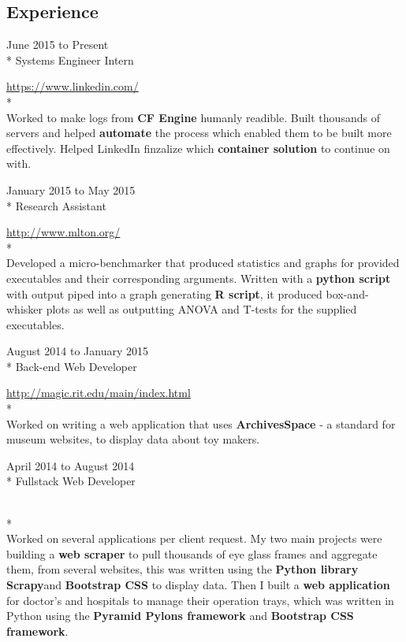 \documentclass[a4paper,margin,line]{resume}
\newcommand{\rurl}[1]{\hfill {\footnotesize \url{#1}}}
\newcommand{\rdate}[1]{\hfill {\small #1}}
\newcommand{\rproject}[4]{\item[#1] \hfill \rdate{#2} \\* \hfill \rdate{#3} \strut\hfill \rurl{#4} \\*}
\begin{document}
\begin{resume}
\section{\mysidestyle Experience}
	\begin{asparadesc}
        \rproject{LinkedIn}{June 2015 to Present}{Systems Engineer Intern}{https://www.linkedin.com/}
        \\
        \small
        Worked to make logs from {\bf CF Engine} humanly readible. Built thousands of servers and helped {\bf automate}
        the process which enabled them to be built more effectively. Helped LinkedIn finzalize which {\bf container 
        solution} to continue on with.
        \normalsize
        \\
        \rproject{Golisano College of Computing and Informational Sciences}{January 2015 to May 2015}{Research Assistant}{http://www.mlton.org/} 
        \\
        \small
        Developed a micro-benchmarker that produced statistics and graphs for provided executables
        and their corresponding arguments. Written with a {\bf python script} with output piped into
        a graph generating {\bf R script}, it produced box-and-whisker plots as well as outputting ANOVA and
        T-tests for the supplied executables.
        \normalsize
        \\
        \rproject{Media Arts Games Interaction and Creativity Center at RIT}{August 2014 to January 2015}{Back-end Web Developer}{http://magic.rit.edu/main/index.html}
		\small
        \\
        Worked on writing a web application that uses {\bf ArchivesSpace} - a
        standard for museum websites, to display data about toy makers.\normalsize
        \\
        \rproject{Earth Moves}{April 2014 to August 2014}{Fullstack Web Developer}{}
        \\
		\small
        Worked on several applications per client request. My two main projects
        were building a {\bf web scraper} to pull thousands of eye glass frames and
        aggregate them, from several websites, this was written using the {\bf Python
        library Scrapy}and {\bf Bootstrap CSS} to display data. Then I built a {\bf web
        application} for doctor's and hospitals to manage their operation trays,
        which was written in Python using the {\bf Pyramid Pylons framework} and
        {\bf Bootstrap CSS framework}. \normalsize
    \end{asparadesc}

\end{resume}
\end{document}
